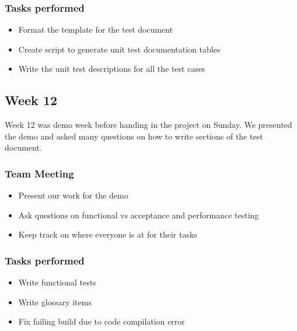\documentclass[12pt]{article}
\begin{document}
\subsubsection{Tasks performed}
\begin{itemize}
    \item Format the template for the test document
    \item Create script to generate unit test documentation tables
    \item Write the unit test descriptions for all the test cases
\end{itemize}

\subsection{Week 12}
Week 12 was demo week before handing in the project on Sunday.
We presented the demo and asked many questions on how to write sections of the test document.

\subsubsection{Team Meeting}
\begin{itemize}
    \item Present our work for the demo
    \item Ask questions on functional vs acceptance and performance testing
    \item Keep track on where everyone is at for their tasks
\end{itemize}

\subsubsection{Tasks performed}
\begin{itemize}
    \item Write functional tests
    \item Write glossary items
    \item Fix failing build due to code compilation error
\end{itemize}
\end{document}
